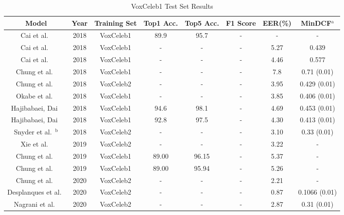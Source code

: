 \documentclass[conference]{IEEEtran}
\begin{document}
\begin{table}[htbp]
    \caption{VoxCeleb1 Test Set Results}
    \begin{center}
        \begin{tabular}{|c|c|c|c|c|c|c|c|}
        \hline
        \textbf{Model} & \textbf{Year} & \textbf{Training Set} &  \textbf{Top1 Acc.} & \textbf{Top5 Acc.} & \textbf{F1 Score} & \textbf{EER(\%)} & \textbf{MinDCF}$^{\mathrm{a}}$\\
        \hline
        Cai et al.~\cite{cai2018exploring} & 2018 & VoxCeleb1 & 89.9 & 95.7 & - & - & - \\
        Cai et al.~\cite{cai2018exploring} & 2018 & VoxCeleb1 & - & - & - & 5.27 & 0.439 \\
        Cai et al.~\cite{cai2018exploring} & 2018 & VoxCeleb1 & - & - & - & 4.46 & 0.577 \\
        Chung et al.~\cite{chung2018voxceleb2} & 2018 & VoxCeleb1 & - & - & - & 7.8 & 0.71 (0.01) \\
        Chung et al.~\cite{chung2018voxceleb2} & 2018 & VoxCeleb2 & - & - & - & 3.95 & 0.429 (0.01) \\
        Okabe et al.~\cite{okabe2018asp} & 2018 & VoxCeleb1 & - & - & - & 3.85 & 0.406 (0.01) \\
        Hajibabaei, Dai~\cite{hajibabaei2018unified} & 2018 & VoxCeleb1 & 94.6 & 98.1 & - & 4.69 & 0.453 (0.01) \\
        Hajibabaei, Dai~\cite{hajibabaei2018unified} & 2018 & VoxCeleb1 & 92.8 & 97.5 & - & 4.30 & 0.413 (0.01) \\
        Snyder et al.~\cite{snyder2018xvectors}$^{\mathrm{b}}$ & 2018 & VoxCeleb2 & - & - & - & 3.10 & 0.33 (0.01) \\
        Xie et al.~\cite{xie2019utterance} & 2019 & VoxCeleb2 & - & - & - & 3.22 & - \\
        Chung et al.~\cite{chung2019delving} & 2019 & VoxCeleb1 & 89.00 & 96.15 & - & 5.37 & - \\
        Chung et al.~\cite{chung2019delving} & 2019 & VoxCeleb1 & 89.00 & 95.94 & - & 5.26 & - \\
        Chung et al.~\cite{chung2020defence} & 2020 & VoxCeleb2 & - & - & - & 2.21 & - \\
        Desplanques et al.~\cite{desplanques2020ecapa} & 2020 & VoxCeleb2 & - & - & - & 0.87 & 0.1066 (0.01) \\
        Nagrani et al.~\cite{nagrani2020voxceleb} & 2020 & VoxCeleb2 & - & - & - & 2.87 & 0.31 (0.01) \\

\end{tabular}
\end{center}
\end{table}
\end{document}
